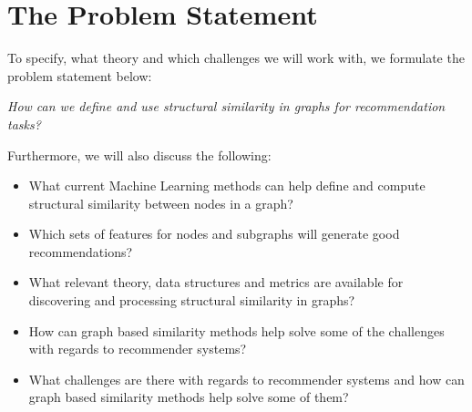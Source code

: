 \section{The Problem Statement}
  To specify, what theory and which challenges we will work with, we formulate the problem statement below:
  \begin{center}
    \textit{How can we define and use structural similarity in graphs for recommendation tasks?}
  \end{center}

  Furthermore, we will also discuss the following:
  \begin{itemize}
    \item What current Machine Learning methods can help define and compute structural similarity between nodes in a graph?
    \item Which sets of features for nodes and subgraphs will generate good recommendations?
    \item What relevant theory, data structures and metrics are available for discovering and processing structural similarity in graphs?
    \item How can graph based similarity methods help solve some of the challenges with regards to recommender systems?
    \item What challenges are there with regards to recommender systems and how can graph based similarity methods help solve some of them?
  \end{itemize}
